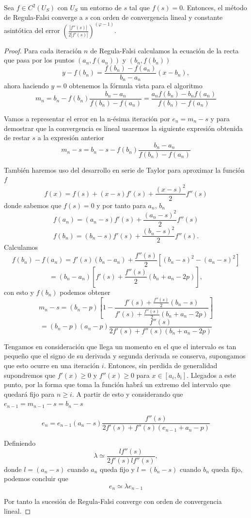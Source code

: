 \begin{teorema}
	Sea $f \in C^2(U_S)$ con $U_S$ un entorno de $s$ tal que $f(s) = 0$. Entonces, el método de Regula-Falsi converge a $s$ con orden de convergencia lineal y constante asintótica del error $(\frac{|f''(s)|}{2|f'(s)|})^{(\varphi - 1)}$.
	
\end{teorema}

\begin{proof}
	Para cada iteración $n$ de Regula-Falsi calculamos la ecuación de la recta que pasa por los puntos $(a_n, f(a_n))$ y $(b_n, f(b_n))$
	\[
		y - f(b_n) = \frac{f(b_n) - f(a_n)}{b_n - a_n}(x - b_n),
	\]
	ahora haciendo $y = 0$ obtenemos la fórmula vista para el algoritmo
	\[
		m_n = b_n - f(b_n) \frac{b_n - a_n}{f(b_n) - f(a_n)} = \frac{a_n f(b_n) - b_n f(a_n)}{f(b_n) - f(a_n)}
	\]
	
	Vamos a representar el error en la n-ésima iteración por $e_n = m_n - s$ y para demostrar que la convergencia es lineal usaremos la siguiente expresión obtenida de restar $s$ a la expresión anterior
	\[
		m_n - s = b_n - s - f(b_n) \frac{b_n - a_n}{f(b_n) - f(a_n)}
	\]
	
	También haremos uso del desarrollo en serie de Taylor para aproximar la función $f$
	\[
		f(x) = f(s) + (x - s) f'(s) + \frac{(x - s)^2}{2} f''(s)
	\]
	donde sabemos que $f(s) = 0$ y por tanto para $a_n$, $b_n$
	\[
		f(a_n) = (a_n - s) f'(s) + \frac{(a_n - s)^2}{2} f''(s)
	\]
	\[
		f(b_n) = (b_n - s) f'(s) + \frac{(b_n - s)^2}{2} f''(s).
	\]
	Calculamos
	\[
		f(b_n) - f(a_n) = f'(s) (b_n - a_n) + \frac{f''(s)}{2}[(b_n - s)^2 - (a_n - s)^2]
	\]
	\[
		= (b_n - a_n) [f'(s) + \frac{f''(s)}{2} (b_n + a_n - 2p)],
	\]
	con esto y $f(b_n)$ podemos obtener
	\[
		m_n - s = (b_n - p)[1 - \frac{f'(s) + \frac{f''(s)}{2} (b_n - s)}{f'(s) + \frac{f''(s)}{2} (b_n + a_n - 2p)}]
	\]
	\[
		= (b_n - p) (a_n - p) \frac{f''(s)}{2 f'(s) + f''(s) (b_n + a_n - 2p)}
	\]
	
	Tengamos en consideración que llega un momento en el que el intervalo es tan pequeño que el signo de su derivada y segunda derivada se conserva, supongamos que esto ocurre en una iteración $i$. Entonces, sin perdida de generalidad supondremos que $f'(x) \geq 0$ y $f''(x) \geq 0$ para $x \in [a_i, b_i]$. Llegados a este punto, por la forma que toma la función habrá un extremo del intervalo que quedará fijo para $n \geq i$. A partir de esto y considerando que $e_{n-1} = m_{n-1} - s = b_n - s$
	
	\[
		e_n = e_{n-1} (a_n - s) \frac{f''(s)}{2 f'(s) + f''(s) (e_{n-1} + a_n - p)}
	\]
	
	Definiendo
	\[
		\lambda \simeq \frac{l f''(s)}{2 f'(s) l f''(s)},
	\]
	donde $l = (a_n - s)$ cuando $a_n$ queda fijo y $l = (b_n - s)$ cuando $b_n$ queda fijo, podemos concluir que
	\[
		e_n \simeq \lambda e_{n-1}
	\]
	
	Por tanto la sucesión de Regula-Falsi converge con orden de convergencia lineal.
\end{proof}


